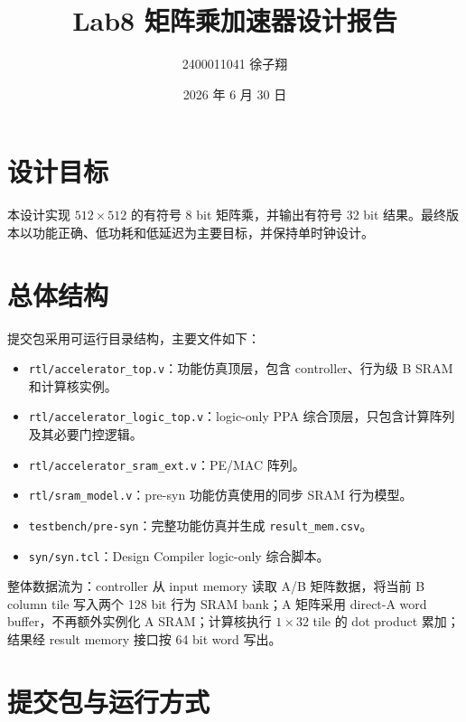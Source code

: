 \documentclass[UTF8,a4paper,zihao=-4]{ctexart}
\title{Lab8 矩阵乘加速器设计报告}
\author{2400011041 徐子翔}
\date{2026 年 6 月 30 日}
\begin{document}
\maketitle

\section{设计目标}

本设计实现 $512\times512$ 的有符号 8 bit 矩阵乘，并输出有符号 32 bit 结果。最终版本以功能正确、低功耗和低延迟为主要目标，并保持单时钟设计。

\section{总体结构}

提交包采用可运行目录结构，主要文件如下：
\begin{itemize}
  \item \texttt{rtl/accelerator\_top.v}：功能仿真顶层，包含 controller、行为级 B SRAM 和计算核实例。
  \item \texttt{rtl/accelerator\_logic\_top.v}：logic-only PPA 综合顶层，只包含计算阵列及其必要门控逻辑。
  \item \texttt{rtl/accelerator\_sram\_ext.v}：PE/MAC 阵列。
  \item \texttt{rtl/sram\_model.v}：pre-syn 功能仿真使用的同步 SRAM 行为模型。
  \item \texttt{testbench/pre-syn}：完整功能仿真并生成 \texttt{result\_mem.csv}。
  \item \texttt{syn/syn.tcl}：Design Compiler logic-only 综合脚本。
\end{itemize}

整体数据流为：controller 从 input memory 读取 A/B 矩阵数据，将当前 B column tile 写入两个 128 bit 行为 SRAM bank；A 矩阵采用 direct-A word buffer，不再额外实例化 A SRAM；计算核执行 $1\times32$ tile 的 dot product 累加；结果经 result memory 接口按 64 bit word 写出。

\section{提交包与运行方式}
\end{document}
